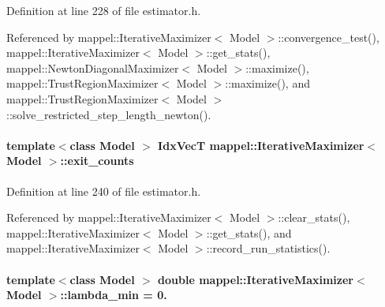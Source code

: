 Definition at line 228 of file estimator.\+h.



Referenced by mappel\+::\+Iterative\+Maximizer$<$ Model $>$\+::convergence\+\_\+test(), mappel\+::\+Iterative\+Maximizer$<$ Model $>$\+::get\+\_\+stats(), mappel\+::\+Newton\+Diagonal\+Maximizer$<$ Model $>$\+::maximize(), mappel\+::\+Trust\+Region\+Maximizer$<$ Model $>$\+::maximize(), and mappel\+::\+Trust\+Region\+Maximizer$<$ Model $>$\+::solve\+\_\+restricted\+\_\+step\+\_\+length\+\_\+newton().

\paragraph[{\texorpdfstring{exit\+\_\+counts}{exit_counts}}]{\setlength{\rightskip}{0pt plus 5cm}template$<$class Model $>$ {\bf Idx\+VecT} {\bf mappel\+::\+Iterative\+Maximizer}$<$ Model $>$\+::exit\+\_\+counts\hspace{0.3cm}{\ttfamily [protected]}}\hypertarget{classmappel_1_1IterativeMaximizer_a8a3554d07f510ab9e68d884307f937cc}{}\label{classmappel_1_1IterativeMaximizer_a8a3554d07f510ab9e68d884307f937cc}


Definition at line 240 of file estimator.\+h.



Referenced by mappel\+::\+Iterative\+Maximizer$<$ Model $>$\+::clear\+\_\+stats(), mappel\+::\+Iterative\+Maximizer$<$ Model $>$\+::get\+\_\+stats(), and mappel\+::\+Iterative\+Maximizer$<$ Model $>$\+::record\+\_\+run\+\_\+statistics().

\paragraph[{\texorpdfstring{lambda\+\_\+min}{lambda_min}}]{\setlength{\rightskip}{0pt plus 5cm}template$<$class Model $>$ double {\bf mappel\+::\+Iterative\+Maximizer}$<$ Model $>$\+::lambda\+\_\+min = 0.\hspace{0.3cm}{\ttfamily [protected]}}\hypertarget{classmappel_1_1IterativeMaximizer_a871576ad8b418a1f05df6a9eba2c60ab}{}\label{classmappel_1_1IterativeMaximizer_a871576ad8b418a1f05df6a9eba2c60ab}



